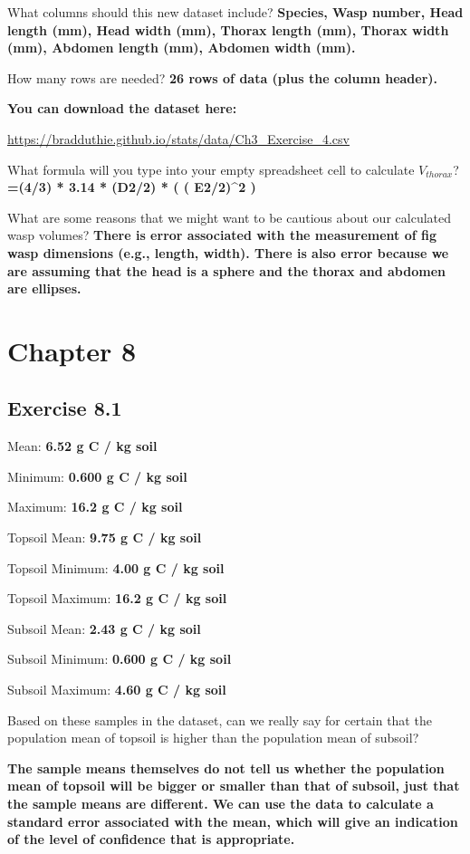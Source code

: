 \documentclass[
  openany]{krantz}
\begin{document}
What columns should this new dataset include? \textbf{Species, Wasp number, Head length (mm), Head width (mm), Thorax length (mm), Thorax width (mm), Abdomen length (mm), Abdomen width (mm).}

How many rows are needed? \textbf{26 rows of data (plus the column header).}

\textbf{You can download the dataset here:}

\url{https://bradduthie.github.io/stats/data/Ch3_Exercise_4.csv}

What formula will you type into your empty spreadsheet cell to calculate \(V_{thorax}\)? \textbf{=(4/3) * 3.14 * (D2/2) * ( ( E2/2)\^{}2 )}

What are some reasons that we might want to be cautious about our calculated wasp volumes? \textbf{There is error associated with the measurement of fig wasp dimensions (e.g., length, width). There is also error because we are assuming that the head is a sphere and the thorax and abdomen are ellipses.}

\hypertarget{chapter-8}{%
\section{Chapter 8}\label{chapter-8}}

\hypertarget{exercise-8.1}{%
\subsection{Exercise 8.1}\label{exercise-8.1}}

Mean: \textbf{6.52 g C / kg soil}

Minimum: \textbf{0.600 g C / kg soil}

Maximum: \textbf{16.2 g C / kg soil}

Topsoil Mean: \textbf{9.75 g C / kg soil}

Topsoil Minimum: \textbf{4.00 g C / kg soil}

Topsoil Maximum: \textbf{16.2 g C / kg soil}

Subsoil Mean: \textbf{2.43 g C / kg soil}

Subsoil Minimum: \textbf{0.600 g C / kg soil}

Subsoil Maximum: \textbf{4.60 g C / kg soil}

Based on these samples in the dataset, can we really say for certain that the population mean of topsoil is higher than the population mean of subsoil?

\textbf{The sample means themselves do not tell us whether the population mean of topsoil will be bigger or smaller than that of subsoil, just that the sample means are different. We can use the data to calculate a standard error associated with the mean, which will give an indication of the level of confidence that is appropriate.}
\end{document}
